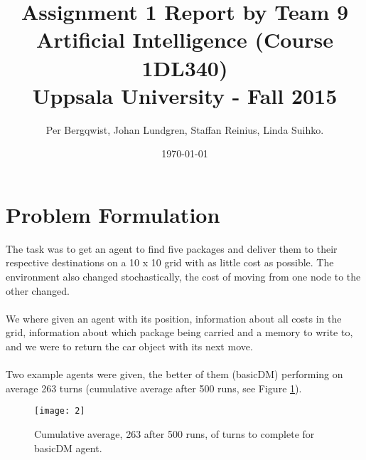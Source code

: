 \documentclass[a4paper]{article}
\title{Assignment 1 Report by Team 9 \\ Artificial Intelligence (Course 1DL340) \\ Uppsala University - Fall 2015\\ }
\author{Per Bergqwist, Johan Lundgren, Staffan Reinius, Linda Suihko.}
\date{\today}
\begin{document}
\maketitle

\vfill

\section{Problem Formulation}

The task was to get an agent to find five packages and deliver them to their respective destinations on a 10 x 10 grid with as little cost as possible. The environment also changed stochastically, the cost of moving from one node to the other changed.\\
\\
We where given an agent with its position, information about all costs in the grid, information about which package being carried and a memory to write to, and we were to return the car object with its next move.\\
\\
Two example agents were given, the better of them (basicDM) performing on average 263 turns (cumulative average after 500 runs, see Figure \ref{fig:prob}).\\
\begin{figure}[H]
  \centering
    \texttt{[image: 2]}
    \caption{Cumulative average, 263 after 500 runs, of turns to complete for basicDM agent.}
    \label{fig:prob}
\end{figure}
\vfill
\newpage
\end{document}
